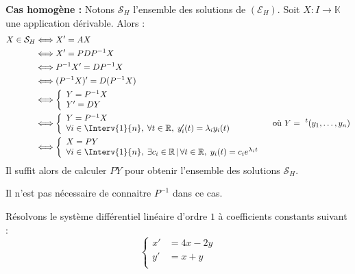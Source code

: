 \documentclass[a4paper,10pt]{report}
\begin{document}
\noindent \textbf{Cas homogène :} Notons $\mathcal{S}_H$ l'ensemble des solutions de $(\mathcal{E}_H)$. Soit $X : I \rightarrow \mathbb{K}$ une application dérivable. Alors :
\begin{align*}
X \in \mathcal{S}_H & \Longleftrightarrow  X'=AX \\
& \Longleftrightarrow X'=PDP^{-1} X\\
& \Longleftrightarrow P^{-1}X'=DP^{-1}X \\
& \Longleftrightarrow (P^{-1}X)'=D(P^{-1}X) \\
& \Longleftrightarrow \left\lbrace \begin{array}{l}
Y=P^{-1}X \\
Y'=DY \\
\end{array}\right. \\
& \Longleftrightarrow \left\lbrace \begin{array}{l}
Y=P^{-1}X \\
\forall i \in \Interv{1}{n}, \; \forall t \in  \mathbb{R},  \; y_i'(t)=\lambda_i y_i(t)  \\
\end{array}\right. \qquad \qquad \hbox{ où } Y= ~^t(y_1, \ldots, y_n) \\
& \Longleftrightarrow \left\lbrace \begin{array}{l}
X=PY \\
\forall i \in \Interv{1}{n}, \; \exists c_i \in  \mathbb{R} \, \vert \, \forall t \in \mathbb{R}, \; y_i(t)=c_i e^{\lambda_i t}  \\
\end{array}\right.
\end{align*}
Il suffit alors de calculer $PY$ pour obtenir l'ensemble des solutions $\mathcal{S}_H$.

\begin{rem} Il n'est pas nécessaire de connaitre $P^{-1}$ dans ce cas.
\end{rem}

\begin{ex} Résolvons le système différentiel linéaire d'ordre $1$ à coefficients constants suivant : 
$$ \left\lbrace \begin{array}{lll}
    x' & = 4x - 2y \\
    y' & = x + y \\
    \end{array}\right.$$
    
    \vspace{12cm}
\end{ex}
\end{document}
